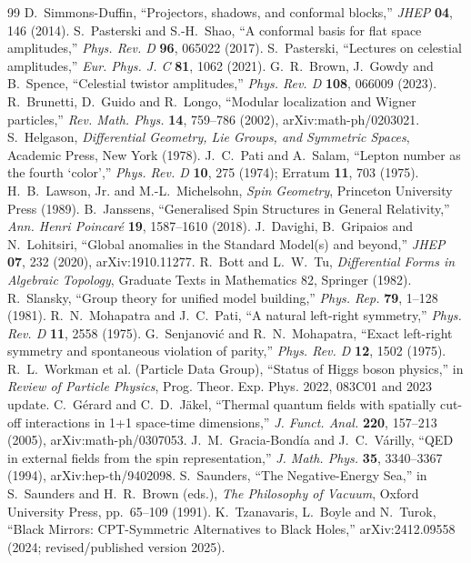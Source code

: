 \documentclass[11pt]{article}
\theoremstyle{definition}\newtheorem{definition}[theorem]{Definition}
\theoremstyle{remark}\newtheorem{remark}[theorem]{Remark}\newtheorem{conjecture}[theorem]{Conjecture}
\begin{document}
\begin{thebibliography}{99}
 D.~Simmons-Duffin, ``Projectors, shadows, and conformal blocks,'' \emph{JHEP} \textbf{04}, 146 (2014).
 S.~Pasterski and S.-H.~Shao, ``A conformal basis for flat space amplitudes,'' \emph{Phys. Rev. D} \textbf{96}, 065022 (2017).
 S.~Pasterski, ``Lectures on celestial amplitudes,'' \emph{Eur. Phys. J. C} \textbf{81}, 1062 (2021).
 G.~R.~Brown, J.~Gowdy and B.~Spence, ``Celestial twistor amplitudes,'' \emph{Phys. Rev. D} \textbf{108}, 066009 (2023).
 R.~Brunetti, D.~Guido and R.~Longo, ``Modular localization and Wigner particles,'' \emph{Rev. Math. Phys.} \textbf{14}, 759--786 (2002), arXiv:math-ph/0203021.
 S.~Helgason, \emph{Differential Geometry, Lie Groups, and Symmetric Spaces}, Academic Press, New York (1978).
 J.~C.~Pati and A.~Salam, ``Lepton number as the fourth `color','' \emph{Phys. Rev. D} \textbf{10}, 275 (1974); Erratum \textbf{11}, 703 (1975).
 H.~B.~Lawson, Jr. and M.-L.~Michelsohn, \emph{Spin Geometry}, Princeton University Press (1989).
 B.~Janssens, ``Generalised Spin Structures in General Relativity,'' \emph{Ann. Henri Poincar\'e} \textbf{19}, 1587--1610 (2018).
 J.~Davighi, B.~Gripaios and N.~Lohitsiri, ``Global anomalies in the Standard Model(s) and beyond,'' \emph{JHEP} \textbf{07}, 232 (2020), arXiv:1910.11277.
 R.~Bott and L.~W.~Tu, \emph{Differential Forms in Algebraic Topology}, Graduate Texts in Mathematics 82, Springer (1982).
 R.~Slansky, ``Group theory for unified model building,'' \emph{Phys. Rep.} \textbf{79}, 1--128 (1981).
 R.~N.~Mohapatra and J.~C.~Pati, ``A natural left-right symmetry,'' \emph{Phys. Rev. D} \textbf{11}, 2558 (1975).
 G.~Senjanovi\'c and R.~N.~Mohapatra, ``Exact left-right symmetry and spontaneous violation of parity,'' \emph{Phys. Rev. D} \textbf{12}, 1502 (1975).
 R.~L.~Workman et al. (Particle Data Group), ``Status of Higgs boson physics,'' in \emph{Review of Particle Physics}, Prog. Theor. Exp. Phys. 2022, 083C01 and 2023 update.
 C.~G\'erard and C.~D.~J\"akel, ``Thermal quantum fields with spatially cut-off interactions in 1+1 space-time dimensions,'' \emph{J. Funct. Anal.} \textbf{220}, 157--213 (2005), arXiv:math-ph/0307053.
 J.~M.~Gracia-Bond\'ia and J.~C.~V\'arilly, ``QED in external fields from the spin representation,'' \emph{J. Math. Phys.} \textbf{35}, 3340--3367 (1994), arXiv:hep-th/9402098.
 S.~Saunders, ``The Negative-Energy Sea,'' in S.~Saunders and H.~R.~Brown (eds.), \emph{The Philosophy of Vacuum}, Oxford University Press, pp.~65--109 (1991).
 K.~Tzanavaris, L.~Boyle and N.~Turok, ``Black Mirrors: CPT-Symmetric Alternatives to Black Holes,'' arXiv:2412.09558 (2024; revised/published version 2025).
\end{thebibliography}
\end{document}

